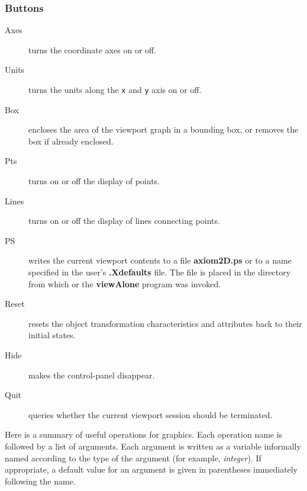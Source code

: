 \subsubsection{Buttons}

%
\begin{description}
%
\item[Axes] turns the coordinate axes on or off.
%
\item[Units] turns the units along the {\tt x}
and {\tt y} axis on or off.
%
\item[Box] encloses the area of the viewport graph
in a bounding box, or removes the box if already enclosed.
%
\item[Pts] turns on or off the display of points.
%
\item[Lines] turns on or off the display
of lines connecting points.
%
\item[PS] writes the current viewport contents to
a file {\bf axiom2D.ps} or to a name specified in the user's {\bf
{}
.Xdefaults} file.
The file is placed in the directory from which \Language{} or the {\bf
viewAlone} program was invoked.
%
\item[Reset] resets the object transformation
characteristics and attributes back to their initial states.
%
\item[Hide] makes the control-panel disappear.
%
\item[Quit] queries whether the current viewport
session should be terminated.
\end{description}


Here is a summary of useful \Language{} operations for \twodim{}
graphics.
Each operation name is followed by a list of arguments.
Each argument is written as a variable informally named according
to the type of the argument (for example, {\it integer}).
If appropriate, a default value for an argument is given in
parentheses immediately following the name.

